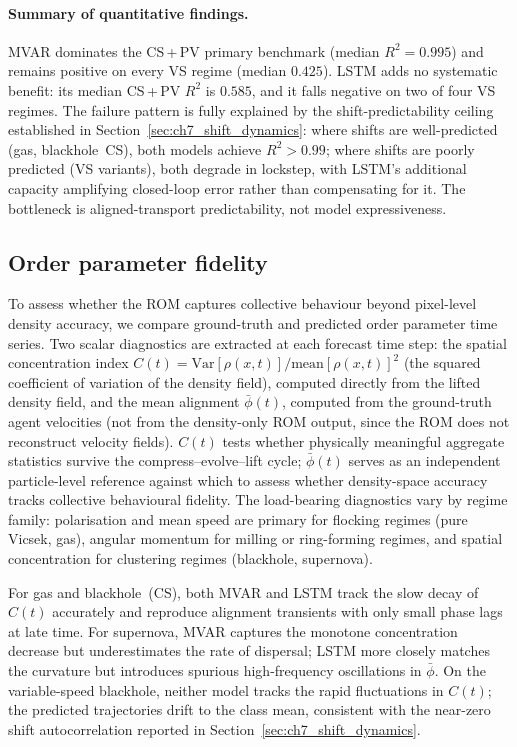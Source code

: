 \paragraph{Summary of quantitative findings.}
MVAR dominates the CS\,+\,PV primary benchmark (median
$R^2{=}0.995$) and remains positive on every VS regime (median
$0.425$).  LSTM adds no systematic benefit: its median CS\,+\,PV
$R^2$ is $0.585$, and it falls negative on two of four VS regimes.
The failure pattern is fully explained by the shift-predictability
ceiling established in Section~\ref{sec:ch7_shift_dynamics}: where
shifts are well-predicted (gas, blackhole~CS), both models achieve
$R^2>0.99$; where shifts are poorly predicted (VS variants), both
degrade in lockstep, with LSTM's additional capacity amplifying
closed-loop error rather than compensating for it.  The bottleneck
is aligned-transport predictability, not model expressiveness.

\subsection*{Order parameter fidelity}
\label{sec:ch7_order_params}

To assess whether the ROM captures collective behaviour beyond pixel-level
density accuracy, we compare ground-truth and predicted order parameter
time series.  Two scalar diagnostics are extracted at each forecast time
step: the spatial concentration index
$C(t)=\mathrm{Var}[\rho(x,t)]/\mathrm{mean}[\rho(x,t)]^2$
(the squared coefficient of variation of the density field),
computed directly from the lifted density field, and the mean alignment
$\bar{\phi}(t)$, computed from the ground-truth agent velocities (not
from the density-only ROM output, since the ROM does not reconstruct
velocity fields).  $C(t)$ tests whether physically meaningful aggregate
statistics survive the compress--evolve--lift cycle; $\bar{\phi}(t)$
serves as an independent particle-level reference against which to assess
whether density-space accuracy tracks collective behavioural fidelity.
The load-bearing diagnostics vary by regime family: polarisation and mean
speed are primary for flocking regimes (pure Vicsek, gas), angular momentum
for milling or ring-forming regimes, and spatial concentration for
clustering regimes (blackhole, supernova).


For gas and blackhole~(CS), both MVAR and LSTM track the slow decay of
$C(t)$ accurately and reproduce alignment transients with only small phase
lags at late time.  For supernova, MVAR captures the monotone concentration
decrease but underestimates the rate of dispersal; LSTM more closely matches
the curvature but introduces spurious high-frequency oscillations in
$\bar{\phi}$.  On the variable-speed blackhole, neither model tracks the
rapid fluctuations in $C(t)$; the predicted trajectories drift to the
class mean, consistent with the near-zero shift autocorrelation reported in
Section~\ref{sec:ch7_shift_dynamics}.

